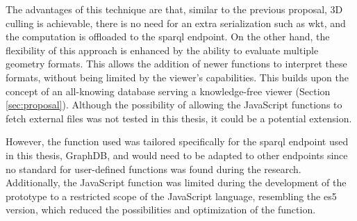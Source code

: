 The advantages of this technique are that, similar to the previous proposal, 3D culling is achievable, there is no need for an extra serialization such as \ac{wkt}, and the computation is offloaded to the \ac{sparql} endpoint. On the other hand, the flexibility of this approach is enhanced by the ability to evaluate multiple geometry formats. This allows the addition of newer functions to interpret these formats, without being limited by the viewer's capabilities. This builds upon the concept of an all-knowing database serving a knowledge-free viewer (Section \ref{sec:proposal}). Although the possibility of allowing the JavaScript functions to fetch external files was not tested in this thesis, it could be a potential extension.

However, the function used was tailored specifically for the \ac{sparql} endpoint used in this thesis, GraphDB, and would need to be adapted to other endpoints since no standard for user-defined functions was found during the research. Additionally, the JavaScript function was limited during the development of the prototype to a restricted scope of the JavaScript language, resembling the \ac{es5} version, which reduced the possibilities and optimization of the function.
